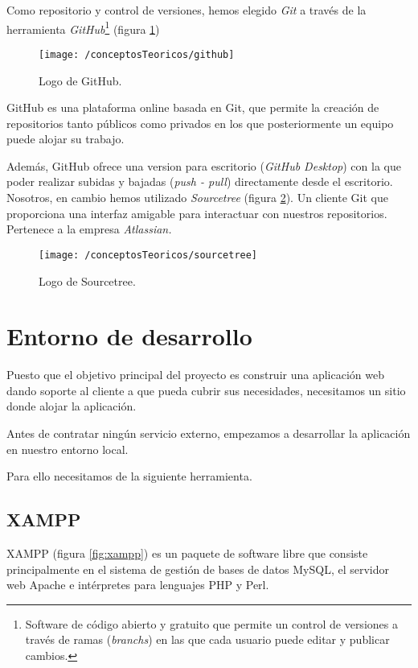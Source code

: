 Como repositorio y control de versiones, hemos elegido \textit{Git} a través de la herramienta \textit{GitHub}\footnote{Software de código abierto y gratuito que permite un control de versiones a través de ramas (\textit{branchs}) en las que cada usuario puede editar y publicar cambios.} (figura \ref{fig:github})

\begin{figure}[ht]
	\centering
	\texttt{[image: /conceptosTeoricos/github]}
	\caption{Logo de GitHub.}
	\label{fig:github}
\end{figure}

GitHub es una plataforma online basada en Git, que permite la creación de repositorios tanto públicos como privados en los que posteriormente un equipo puede alojar su trabajo.

Además, GitHub ofrece una version para escritorio (\textit{GitHub Desktop}) con la que poder realizar subidas y bajadas (\textit{push - pull}) directamente desde el escritorio. Nosotros, en cambio hemos utilizado \textit{Sourcetree} (figura \ref{fig:sourcetree}). Un cliente Git que proporciona una interfaz amigable para interactuar con nuestros repositorios. Pertenece a la empresa \textit{Atlassian.}

\begin{figure}[ht]
	\centering
	\texttt{[image: /conceptosTeoricos/sourcetree]}
	\caption{Logo de Sourcetree.}
	\label{fig:sourcetree}
\end{figure}

\newpage

\section{Entorno de desarrollo}

Puesto que el objetivo principal del proyecto es construir una aplicación web dando soporte al cliente a que pueda cubrir sus necesidades, necesitamos un sitio donde alojar la aplicación. 

Antes de contratar ningún servicio externo, empezamos a desarrollar la aplicación en nuestro entorno local. 

Para ello necesitamos de la siguiente herramienta.

\subsection{XAMPP}

XAMPP (figura \ref{fig:xampp}) es un paquete de software libre que consiste principalmente en el sistema de gestión de bases de datos MySQL, el servidor web Apache e intérpretes para lenguajes PHP y Perl. \cite{wiki:xampp}

